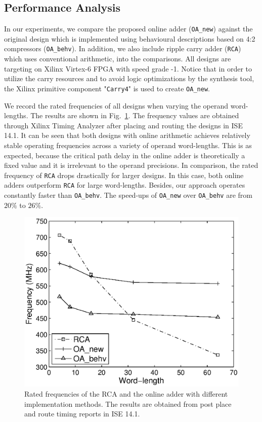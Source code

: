 \documentclass[conference]{IEEEtran}
\begin{document}
\subsection{Performance Analysis}\label{subsec:OA_Performance}
In our experiments, we compare the proposed online adder (\texttt{OA\_new}) against the original design which is implemented using behavioural descriptions based on 4:2 compressors (\texttt{OA\_behv}).  In addition, we also include ripple carry adder (\texttt{RCA}) which uses conventional arithmetic, into the comparisons. All designs are targeting on Xilinx Virtex-6 FPGA with speed grade -1. Notice that in order to utilize the carry resources and to avoid logic optimizations by the synthesis tool, the Xilinx primitive component "\texttt{Carry4}" is used to create \texttt{OA\_new}.


We record the rated frequencies of all designs when varying the operand word-lengths. The results are shown in Fig.~\ref{Fig:AdderFreq}. The frequency values are obtained through Xilinx Timing Analyzer after placing and routing the designs in ISE 14.1. It can be seen that both designs with online arithmetic achieves relatively stable operating frequencies across a variety of operand word-lengths. This is as expected, because the critical path delay in the online adder is theoretically a fixed value and it is irrelevant to the operand precisions. In comparison, the rated frequency of \texttt{RCA} drops drastically for larger designs. In this case, both online adders outperform \texttt{RCA} for large word-lengths. Besides, our approach operates constantly faster than \texttt{OA\_behv}. The speed-ups of \texttt{OA\_new} over \texttt{OA\_behv} are from $20\%$ to $26\%$.

\begin{figure}[tbp]
	\centering
	\includegraphics[width=.45\textwidth]{./Figures/Exp/Adder_Freq.eps}
	\caption{Rated frequencies of the RCA and the online adder with different implementation methods. The results are obtained from post place and route timing reports in ISE 14.1.}
	\label{Fig:AdderFreq}
	\vspace{-1ex}
\end{figure}
\end{document}
